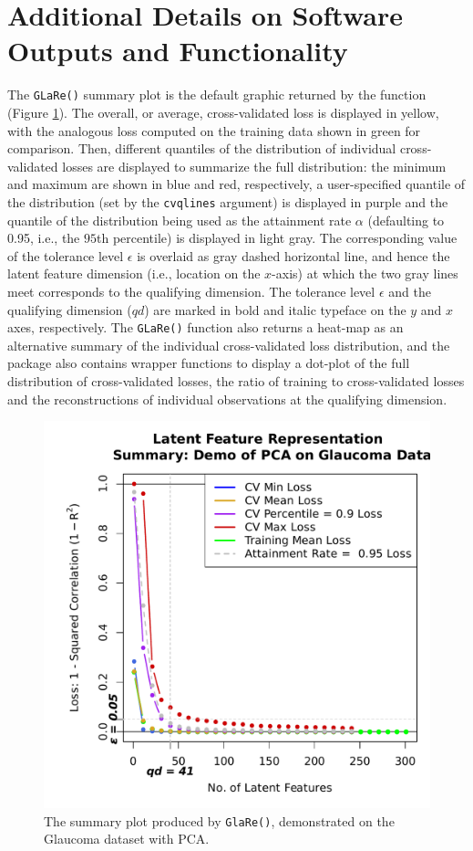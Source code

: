 \section{Additional Details on Software Outputs and Functionality}\label{sec:additional-outputs}

The \texttt{GLaRe()} summary plot is the default graphic returned by the  function (Figure \ref{fig:glare-anatomy-plot}).
The overall, or average, cross-validated loss is displayed in yellow, with the analogous loss computed on the training data shown in green for comparison.
Then, different quantiles of the distribution of individual cross-validated losses are displayed to summarize the full distribution: the minimum and maximum are shown in blue and red, respectively, a user-specified quantile of the distribution (set by the \texttt{cvqlines} argument) is displayed in purple and the quantile of the distribution being used as the attainment rate $\alpha$ (defaulting to 0.95, i.e., the $95$th percentile) is displayed in light gray.
The corresponding value of the tolerance level $\epsilon$ is overlaid as gray dashed horizontal line, and hence the latent feature dimension (i.e., location on the $x$-axis) at which the two gray lines meet corresponds to the qualifying dimension.
The tolerance level $\epsilon$ and the qualifying dimension ($qd$) are marked in bold and italic typeface on the $y$ and $x$ axes, respectively.
The \texttt{GLaRe()} function also returns a heat-map as an alternative summary of the individual cross-validated loss distribution, and the package also contains wrapper functions to display a dot-plot of the full distribution of cross-validated losses, the ratio of training to cross-validated losses and the reconstructions of individual observations at the qualifying dimension. 

\begin{figure}
    \centering
    \includegraphics[width=0.5\linewidth]{figures/glare-anatomy-plot.pdf}
    \caption{The summary plot produced by \texttt{GlaRe()}, demonstrated on the Glaucoma dataset with PCA.}
    \label{fig:glare-anatomy-plot}
\end{figure}

